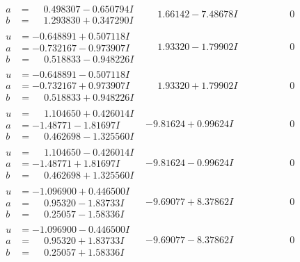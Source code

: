 \documentclass[1p]{elsarticle_modified}
\theoremstyle{definition}
\begin{document}
$$\begin{array}{c|c|c}
\begin{aligned}
a &= \phantom{-}0.498307 - 0.650794 I \\
b &= \phantom{-}1.293830 + 0.347290 I\end{aligned}
 & \phantom{-}1.66142 - 7.48678 I & \phantom{-0.000000 } 0 \\ \hline\begin{aligned}
u &= -0.648891 + 0.507118 I \\
a &= -0.732167 - 0.973907 I \\
b &= \phantom{-}0.518833 - 0.948226 I\end{aligned}
 & \phantom{-}1.93320 - 1.79902 I & \phantom{-0.000000 } 0 \\ \hline\begin{aligned}
u &= -0.648891 - 0.507118 I \\
a &= -0.732167 + 0.973907 I \\
b &= \phantom{-}0.518833 + 0.948226 I\end{aligned}
 & \phantom{-}1.93320 + 1.79902 I & \phantom{-0.000000 } 0 \\ \hline\begin{aligned}
u &= \phantom{-}1.104650 + 0.426014 I \\
a &= -1.48771 - 1.81697 I \\
b &= \phantom{-}0.462698 - 1.325560 I\end{aligned}
 & -9.81624 + 0.99624 I & \phantom{-0.000000 } 0 \\ \hline\begin{aligned}
u &= \phantom{-}1.104650 - 0.426014 I \\
a &= -1.48771 + 1.81697 I \\
b &= \phantom{-}0.462698 + 1.325560 I\end{aligned}
 & -9.81624 - 0.99624 I & \phantom{-0.000000 } 0 \\ \hline\begin{aligned}
u &= -1.096900 + 0.446500 I \\
a &= \phantom{-}0.95320 - 1.83733 I \\
b &= \phantom{-}0.25057 - 1.58336 I\end{aligned}
 & -9.69077 + 8.37862 I & \phantom{-0.000000 } 0 \\ \hline\begin{aligned}
u &= -1.096900 - 0.446500 I \\
a &= \phantom{-}0.95320 + 1.83733 I \\
b &= \phantom{-}0.25057 + 1.58336 I\end{aligned}
 & -9.69077 - 8.37862 I & \phantom{-0.000000 } 0 \\ \hline\begin{aligned}

\end{aligned}
\end{array}$$
\end{document}
